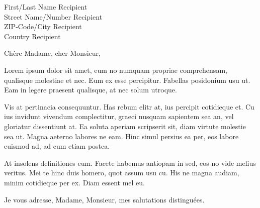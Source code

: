 \documentclass[
    SN, %
    backaddress=true, %
    fontsize=12pt,
    fromalign=left,
    fromemail=true,
    fromfax=false,
    fromphone=true,
    fromrule=off, %
    fromurl=false,
    numericaldate=false,
    paper=a4,
    enlargefirstpage=true,
    parskip=full, %
    parskip=half,
    pagenumber=footcenter,
    subject=beforeopening,
    subject=left,
    subject=titled,
    foldmarks=true, %
    foldmarks=bhlmPtv, %
]{scrlttr2}
\begin{document}
\begin{letter}{
    First/Last Name Recipient\\
    Street Name/Number Recipient\\
    ZIP-Code/City Recipient\\
    Country Recipient
}

    \opening{Chère Madame, cher Monsieur,}

    Lorem ipsum dolor sit amet, eum no numquam propriae comprehensam, qualisque molestiae et nec. Eum ex esse percipitur. Fabellas posidonium usu ut. Eam in legere praesent qualisque, at nec solum utroque.

    Vis at pertinacia consequuntur. Has rebum elitr at, ius percipit cotidieque et. Cu ius invidunt vivendum complectitur, graeci nusquam sapientem sea an, vel gloriatur dissentiunt at. Ea soluta aperiam scripserit sit, diam virtute molestie sea ut. Magna aeterno labores ne eam. Hinc simul persius ea per, eos labore euismod ad, ad cum etiam postea.

    At insolens definitiones eum. Facete habemus antiopam in sed, eos no vide melius veritus. Mei te hinc duis homero, quot assum usu cu. His ne magna audiam, minim cotidieque per ex. Diam essent mel eu.

    \closing{Je vous adresse, Madame, Monsieur, mes salutations distinguées.}



\end{letter}
\end{document}
